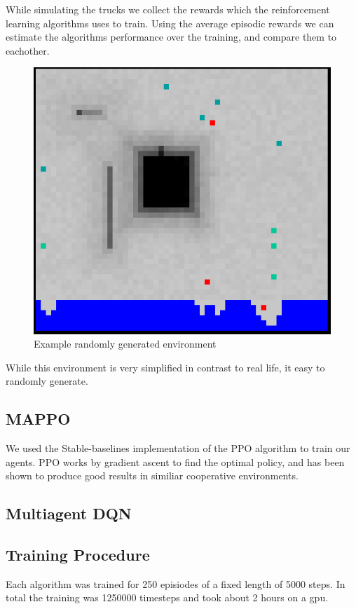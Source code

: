 \documentclass[conference]{IEEEtran}
\begin{document}
While simulating the trucks we collect the rewards which the reinforcement learning algorithms uses to train.
Using the average episodic rewards we can estimate the algorithms performance over the training, and compare them to eachother.
\begin{figure}
  \includegraphics[width=0.9\columnwidth]{graphs/example_env.png}
  \caption{Example randomly generated environment}
\end{figure}
While this environment is very simplified in contrast to real life, it easy to randomly generate.

\subsection{MAPPO}
We used the Stable-baselines implementation of the PPO algorithm to train our agents.
PPO works by gradient ascent to find the optimal policy, and has been shown to produce good results in similiar cooperative environments. %


\subsection{Multiagent DQN}

\subsection{Training Procedure}
Each algorithm was trained for 250 episiodes of a fixed length of 5000 steps. In total the training was 1250000 timesteps and took about 2 hours on a gpu.
\end{document}
